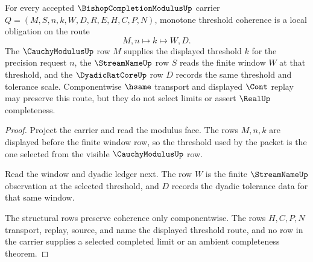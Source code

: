 \begin{theorem}
\label{thm:bishop-completion-modulus-threshold-coherence}
For every accepted $\BishopCompletionModulusUp$ carrier $Q=(M,S,n,k,W,D,R,E,H,C,P,N)$, monotone threshold coherence is a local obligation on the route
$$
M,n \longmapsto k \longmapsto W,D .
$$
The $\CauchyModulusUp$ row $M$ supplies the displayed threshold $k$ for the precision request $n$, the $\StreamNameUp$ row $S$ reads the finite window $W$ at that threshold, and the $\DyadicRatCoreUp$ row $D$ records the same threshold and tolerance scale. Componentwise $\hsame$ transport and displayed $\Cont$ replay may preserve this route, but they do not select limits or assert $\RealUp$ completeness.
\end{theorem}
\begin{proof}
Project the carrier and read the modulus face. The rows $M,n,k$ are displayed before the finite window row, so the threshold used by the packet is the one selected from the visible $\CauchyModulusUp$ row.

Read the window and dyadic ledger next. The row $W$ is the finite $\StreamNameUp$ observation at the selected threshold, and $D$ records the dyadic tolerance data for that same window.

The structural rows preserve coherence only componentwise. The rows $H,C,P,N$ transport, replay, source, and name the displayed threshold route, and no row in the carrier supplies a selected completed limit or an ambient completeness theorem.
\end{proof}

